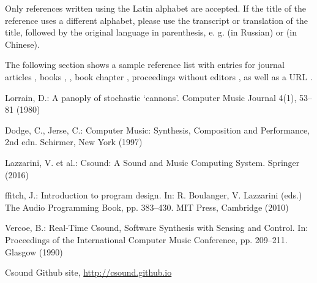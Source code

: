 \documentclass[runningheads,a4paper]{llncs}
\begin{document}
Only references written using the Latin alphabet are accepted. If the title of
the reference uses a different alphabet, please use the transcript or
translation of the title, followed by the original language in parenthesis, e.
g. (in Russian) or (in Chinese).

The following section shows a sample reference list with entries for
journal articles \cite{jour}, books \cite{book1}, \cite{book2}, book chapter
\cite{chapter}, proceedings without editors \cite{proceeding}, as well as a
URL \cite{url}.

\begin{thebibliography}{4}

 Lorrain, D.: A panoply of stochastic `cannons'. Computer Music Journal 4(1), 53--81 (1980)

 Dodge, C., Jerse, C.: Computer Music: Synthesis, Composition and 
Performance, 2nd edn. Schirmer, New York (1997)

 Lazzarini, V. et al.: Csound: A Sound and Music Computing System.
Springer (2016)

 ffitch, J.: Introduction to program design. In: R. Boulanger,
V. Lazzarini (eds.) The Audio Programming Book, pp. 383--430.
MIT Press, Cambridge (2010)

 Vercoe, B.: Real-Time Csound, Software Synthesis with
Sensing and Control. In: Proceedings of the International Computer Music
Conference, pp. 209--211. Glasgow (1990)

 Csound Github site, \url{http://csound.github.io}


\end{thebibliography}
\end{document}
